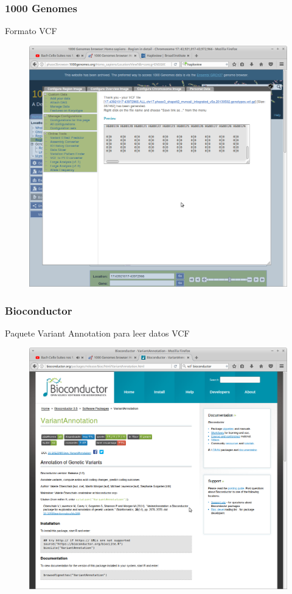 \documentclass{beamer}\usepackage[]{graphicx}\usepackage[]{color}
\begin{document}
\begin{frame}[fragile]
\frametitle{1000 Genomes}
Formato VCF
\begin{figure}[htbp]
\begin{center}
\includegraphics[width=.7\linewidth]{vcf2.png}
\end{center}
\end{figure}
\end{frame}



\begin{frame}[fragile]
\frametitle{Bioconductor}
Paquete Variant Annotation para leer datos VCF
\begin{figure}[htbp]
\begin{center}
\includegraphics[width=.7\linewidth]{variantaanot.png}
\end{center}
\end{figure}
\end{frame}
\end{document}
